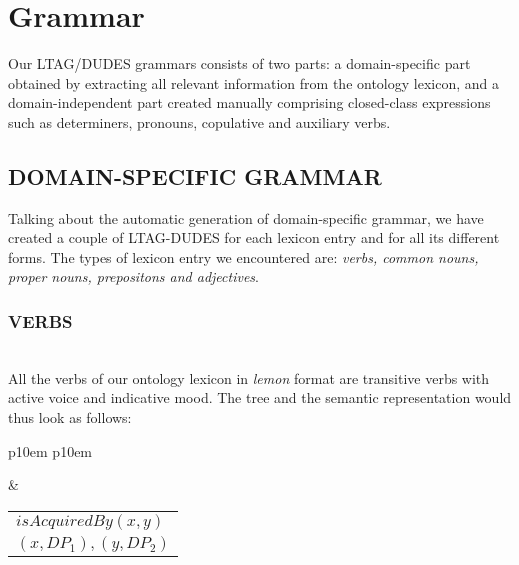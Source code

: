\section{Grammar}
\label{sec:grammar}

Our LTAG/DUDES grammars consists of two parts: a domain-specific part obtained by extracting all relevant information from the ontology lexicon, and a domain-independent part created manually comprising closed-class expressions such as determiners, pronouns, copulative and auxiliary verbs.

\subsection{DOMAIN-SPECIFIC GRAMMAR}
Talking about the automatic generation of domain-specific grammar, we have created a couple of LTAG-DUDES for each lexicon entry and for all its different forms. The types of lexicon entry we encountered are: \textit{verbs, common nouns, proper nouns, prepositons and adjectives}.

\subsubsection{VERBS}\mbox{}\\
All the verbs of our ontology lexicon in \textit{lemon} format are transitive verbs with active voice and indicative mood. The tree and the semantic representation would thus look as follows:

\medskip
\begin{center}
\begin{tabular}{ p{10em} p{10em} }
	\label{tbl:grammar.acquire}
	
	\begin{center}
		\begin{tikzpicture}
		\Tree [.S [.DP$_1\downarrow$ ] [.VP [.V acquire ] DP$_2\downarrow$ ] ]	
		\end{tikzpicture}
	\end{center}
	
	&

	\begin{center}
		\begin{tabular}{|c|l|}
			\hline
			\mbox{} & \mbox{}\\
			\hline
			\multicolumn{2}{|l|}{
				$isAcquiredBy(x,y)$
			} \\
			\hline
			\multicolumn{2}{|l|}{
				$(x,DP_{1}),(y,DP_{2})$
			} \\
			\hline
		\end{tabular}
	\end{center}	
	\\
\end{tabular}
\end{center}
\medskip

